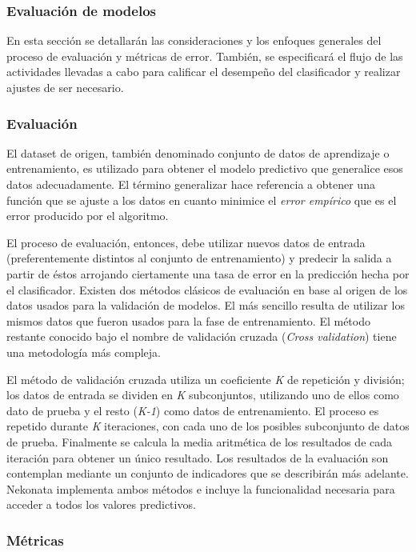 \subsubsection{Evaluación de modelos}

En esta sección se detallarán las consideraciones y los enfoques generales
del proceso de evaluación y métricas de error. También, se especificará
el flujo de las actividades llevadas a cabo para calificar el desempeño
del clasificador y realizar ajustes de ser necesario. 


\subsubsection*{Evaluación}

El dataset de origen, también denominado conjunto de datos de aprendizaje
o entrenamiento, es utilizado para obtener el modelo predictivo que
generalice esos datos adecuadamente. El término generalizar hace referencia
a obtener una función que se ajuste a los datos en cuanto minimice
el \emph{error empírico} que es el error producido por el algoritmo. 

El proceso de evaluación, entonces, debe utilizar nuevos datos de
entrada (preferentemente distintos al conjunto de entrenamiento) y
predecir la salida a partir de éstos arrojando ciertamente una tasa
de error en la predicción hecha por el clasificador. Existen dos métodos
clásicos de evaluación en base al origen de los datos usados para
la validación de modelos. El más sencillo resulta de utilizar los
mismos datos que fueron usados para la fase de entrenamiento. El método
restante conocido bajo el nombre de validación cruzada (\emph{Cross
validation}) tiene una metodología más compleja. 

El método de validación cruzada utiliza un coeficiente \emph{K} de
repetición y división; los datos de entrada se dividen en \emph{K}
subconjuntos, utilizando uno de ellos como dato de prueba y el resto
(\emph{K-1}) como datos de entrenamiento. El proceso es repetido durante
\emph{K} iteraciones, con cada uno de los posibles subconjunto de
datos de prueba. Finalmente se calcula la media aritmética de los
resultados de cada iteración para obtener un único resultado. Los
resultados de la evaluación son contemplan mediante un conjunto de
indicadores que se describirán más adelante. Nekonata implementa ambos
métodos e incluye la funcionalidad necesaria para acceder a todos
los valores predictivos. 


\subsubsection*{Métricas}

